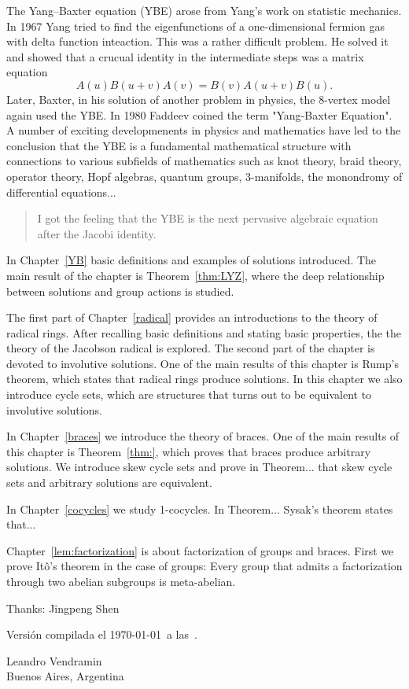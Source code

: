 
The Yang--Baxter equation (YBE) arose from Yang's work on statistic mechanics. In 1967 Yang tried to find the eigenfunctions of a one-dimensional fermion gas with delta function inteaction. This was
a rather difficult problem. He solved it and showed that a crucual identity in the intermediate steps was a matrix equation
\[
A(u)B(u+v)A(v)=B(v)A(u+v)B(u).
\]
Later, Baxter, in his solution of another problem in physics, the 8-vertex model again used the YBE. 
In 1980 Faddeev coined the term "Yang-Baxter Equation". A number of exciting developmenents in 
physics and mathematics have led to the conclusion that the YBE is a fundamental mathematical structure with connections to various subfields of mathematics such as 
knot theory, braid theory, operator theory, Hopf algebras, quantum groups, 3-manifolds, the monondromy of differential equations...

\begin{quote}
    I got the feeling that the YBE is the next pervasive algebraic equation after the Jacobi identity.
\end{quote}


\medskip
In Chapter~\ref{YB} basic definitions and examples of solutions introduced. 
The main result of the chapter is Theorem~\ref{thm:LYZ}, where the deep relationship between
solutions and group actions is studied. 

The first part of Chapter~\ref{radical} provides an introductions to the theory of radical rings.
After recalling basic definitions and stating basic properties, the the theory of the Jacobson
radical is explored. The second part of the chapter is devoted to involutive solutions. One of the
main results of this chapter is Rump's theorem, which states that radical rings produce solutions. In this
chapter we also introduce cycle sets, which are structures that turns out to be equivalent
to involutive solutions. 

In Chapter~\ref{braces} we introduce the theory of braces. One of the main results of this 
chapter is Theorem~\ref{thm:}, which proves that braces produce arbitrary solutions. We introduce
skew cycle sets and prove in Theorem... that skew cycle sets and arbitrary solutions are equivalent. 

In Chapter~\ref{cocycles} we study 1-cocycles. 
In Theorem... 
Sysak's theorem states that...

Chapter~\ref{lem:factorization} is about factorization of groups and braces. First
we prove It\^o's theorem in the case of groups: Every group that admits a factorization through two 
abelian subgroups is meta-abelian. 

Thanks: Jingpeng Shen

\medskip
Versión compilada el \today~a las~\currenttime.

\begin{flushright}
Leandro Vendramin\\Buenos Aires, Argentina\par
\end{flushright}

